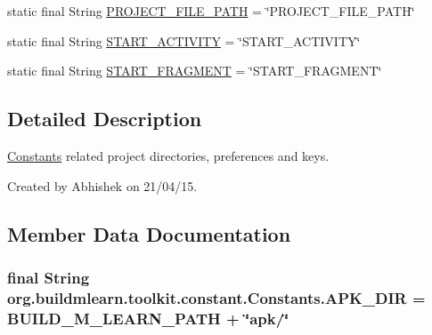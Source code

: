\begin{DoxyCompactItemize}
\item 
static final String \hyperlink{classorg_1_1buildmlearn_1_1toolkit_1_1constant_1_1Constants_ab2586e8aa144cd7e8b4928186d709ea8}{P\+R\+O\+J\+E\+C\+T\+\_\+\+F\+I\+L\+E\+\_\+\+P\+A\+TH} = \char`\"{}P\+R\+O\+J\+E\+C\+T\+\_\+\+F\+I\+L\+E\+\_\+\+P\+A\+TH\char`\"{}
\item 
static final String \hyperlink{classorg_1_1buildmlearn_1_1toolkit_1_1constant_1_1Constants_a2799e097282009a747db0225f72508ff}{S\+T\+A\+R\+T\+\_\+\+A\+C\+T\+I\+V\+I\+TY} = \char`\"{}S\+T\+A\+R\+T\+\_\+\+A\+C\+T\+I\+V\+I\+TY\char`\"{}
\item 
static final String \hyperlink{classorg_1_1buildmlearn_1_1toolkit_1_1constant_1_1Constants_a0c39fd90b89fc7f00dd4b59e90df7325}{S\+T\+A\+R\+T\+\_\+\+F\+R\+A\+G\+M\+E\+NT} = \char`\"{}S\+T\+A\+R\+T\+\_\+\+F\+R\+A\+G\+M\+E\+NT\char`\"{}
\end{DoxyCompactItemize}


\subsection{Detailed Description}
\hyperlink{classorg_1_1buildmlearn_1_1toolkit_1_1constant_1_1Constants}{Constants} related project directories, preferences and keys. 

Created by Abhishek on 21/04/15. 

\subsection{Member Data Documentation}
\subsubsection[{\texorpdfstring{A\+P\+K\+\_\+\+D\+IR}{APK_DIR}}]{\setlength{\rightskip}{0pt plus 5cm}final String org.\+buildmlearn.\+toolkit.\+constant.\+Constants.\+A\+P\+K\+\_\+\+D\+IR = {\bf B\+U\+I\+L\+D\+\_\+\+M\+\_\+\+L\+E\+A\+R\+N\+\_\+\+P\+A\+TH} + \char`\"{}apk/\char`\"{}\hspace{0.3cm}{\ttfamily [static]}}\hypertarget{classorg_1_1buildmlearn_1_1toolkit_1_1constant_1_1Constants_ad32e350b2a3bc331971d274727ce69c5}{}\label{classorg_1_1buildmlearn_1_1toolkit_1_1constant_1_1Constants_ad32e350b2a3bc331971d274727ce69c5}
